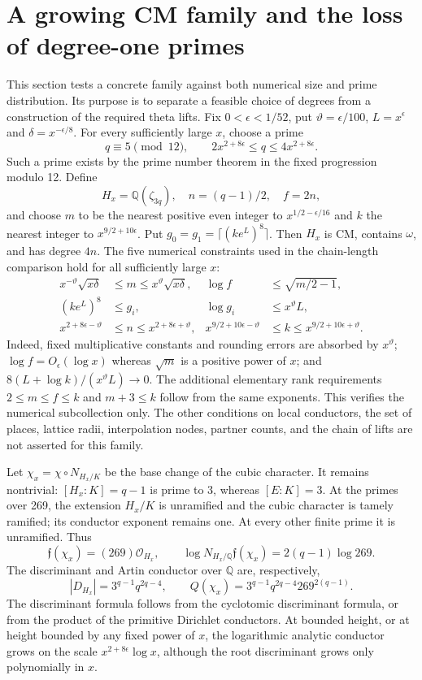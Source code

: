 \documentclass[11pt]{article}
\theoremstyle{remark}\newtheorem{remark}[theorem]{Remark}
\newcommand{\Q}{\mathbb Q}\newcommand{\Z}{\mathbb Z}\newcommand{\C}{\mathbb C}
\begin{document}
\section{A growing CM family and the loss of degree-one primes}
This section tests a concrete family against both numerical size and prime distribution. Its purpose is to separate a feasible choice of degrees from a construction of the required theta lifts.
Fix $0<\epsilon<1/52$, put $\vartheta=\epsilon/100$, $L=x^\epsilon$ and $\delta=x^{-\epsilon/8}$. For every sufficiently large $x$, choose a prime
\[
 q\equiv5\pmod {12},\qquad
 2x^{2+8\epsilon}\le q\le4x^{2+8\epsilon}.
\]
Such a prime exists by the prime number theorem in the fixed progression modulo 12. Define
\[
 H_x=\Q(\zeta_{3q}),\quad n=(q-1)/2,\quad f=2n,
\]
and choose $m$ to be the nearest positive even integer to $x^{1/2-\epsilon/16}$ and $k$ the nearest integer to $x^{9/2+10\epsilon}$. Put $g_0=g_1=\lceil(ke^L)^8\rceil$. Then $H_x$ is CM, contains $\omega$, and has degree $4n$. The five numerical constraints used in the chain-length comparison hold for all sufficiently large $x$:
\begin{align*}
 x^{-\vartheta}\sqrt{x\delta}&\le m\le x^{\vartheta}\sqrt{x\delta},&
 \log f&\le\sqrt{m/2-1},\\
 (ke^L)^8&\le g_i,&\log g_i&\le x^\vartheta L,\\
 x^{2+8\epsilon-\vartheta}&\le n\le x^{2+8\epsilon+\vartheta},&
 x^{9/2+10\epsilon-\vartheta}&\le k\le x^{9/2+10\epsilon+\vartheta}.
\end{align*}
Indeed, fixed multiplicative constants and rounding errors are absorbed by $x^{\vartheta}$; $\log f=O_\epsilon(\log x)$ whereas $\sqrt m$ is a positive power of $x$; and
$8(L+\log k)/(x^{\vartheta}L)\to0$.
The additional elementary rank requirements $2\le m\le f\le k$ and $m+3\le k$ follow from the same exponents. This verifies the numerical subcollection only. The other conditions on local conductors, the set of places, lattice radii, interpolation nodes, partner counts, and the chain of lifts are not asserted for this family.

Let $\chi_x=\chi\circ N_{H_x/K}$ be the base change of the cubic character. It remains nontrivial: $[H_x:K]=q-1$ is prime to 3, whereas $[E:K]=3$. At the primes over 269, the extension $H_x/K$ is unramified and the cubic character is tamely ramified; its conductor exponent remains one. At every other finite prime it is unramified. Thus
\[
 \mathfrak f(\chi_x)=(269)\mathcal O_{H_x},\qquad
 \log N_{H_x/\Q}\mathfrak f(\chi_x)=2(q-1)\log269.
\]
The discriminant and Artin conductor over $\Q$ are, respectively,
\[
 |D_{H_x}|=3^{q-1}q^{2q-4},\qquad
 Q(\chi_x)=3^{q-1}q^{2q-4}269^{2(q-1)}.
\]
The discriminant formula follows from the cyclotomic discriminant formula, or from the product of the primitive Dirichlet conductors. At bounded height, or at height bounded by any fixed power of $x$, the logarithmic analytic conductor grows on the scale $x^{2+8\epsilon}\log x$, although the root discriminant grows only polynomially in $x$.
\end{document}
